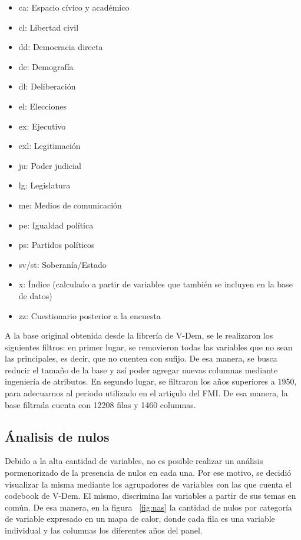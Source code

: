\documentclass{article}
\begin{document}
\begin{itemize}
  \item ca: Espacio cívico y académico
  \item cl: Libertad civil
  \item dd: Democracia directa
  \item de: Demografía
  \item dl: Deliberación
  \item el: Elecciones
  \item ex: Ejecutivo
  \item exl: Legitimación
  \item ju: Poder judicial
  \item lg: Legislatura
  \item me: Medios de comunicación
  \item pe: Igualdad política
  \item ps: Partidos políticos
  \item sv/st: Soberanía/Estado
  \item x: Índice (calculado a partir de variables que también se 
  incluyen en la base de datos)
  \item zz: Cuestionario posterior a la encuesta
\end{itemize}

A la base original obtenida desde la librería de V-Dem, se le realizaron los
siguientes filtros: en primer lugar, se removieron todas las variables que
no sean las principales, es decir, que no cuenten con sufijo. De esa manera,
se busca reducir el tamaño de la base y así poder agregar nuevas columnas
mediante ingeniería de atributos. En segundo lugar, se filtraron los años 
superiores a 1950, para adecuarnos al periodo utilizado en el artiçulo del FMI.
De esa manera, la base filtrada cuenta con 12208 filas y 1460 columnas.

\subsection{Ánalisis de nulos}
Debido a la alta cantidad de variables, no es posible realizar un análisis
pormenorizado de la presencia de nulos en cada una. Por ese motivo, se decidió
visualizar la misma mediante los agrupadores de variables con las que cuenta el
codebook de V-Dem. El mismo, discrimina las variables a partir de sus temas en común.
De esa manera, en la figura ~\ref{fig:nas} la cantidad de nulos por categoría de variable
expresado en un mapa de calor, donde cada fila es una variable individual y las
columnas los diferentes años del panel.
\end{document}
